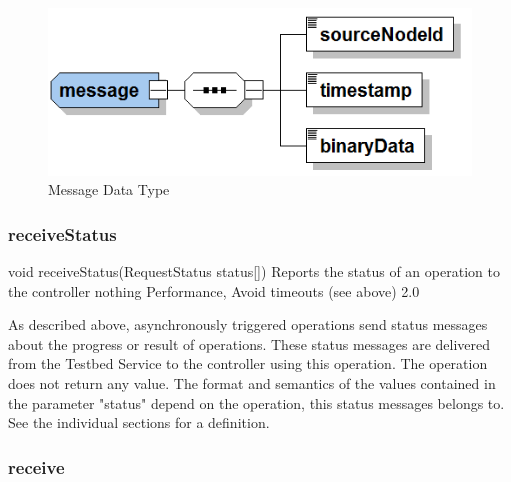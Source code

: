 	\begin{figure}[htb]
		\centering
		\includegraphics[width=0.95\columnwidth]{images/datatype-message}
		\caption{Message Data Type}
		\label{fig:datatype-message}
	\end{figure}

		\subsubsection{receiveStatus}

\begin{apidoc}
	{void receiveStatus(RequestStatus status[])} %
	{Reports the status of an operation to the controller} %
	{
	} %
	{nothing} %
	{Performance, Avoid timeouts (see above)} %
	{2.0} %
\end{apidoc}

As described above, asynchronously triggered operations send status messages about the progress or result of operations. These status messages are delivered from the Testbed Service to the controller using this operation. The operation does not return any value. The format and semantics of the values contained in the parameter "status" depend on the operation, this status messages belongs to. See the individual sections for a definition.

			\subsubsection{receive}

